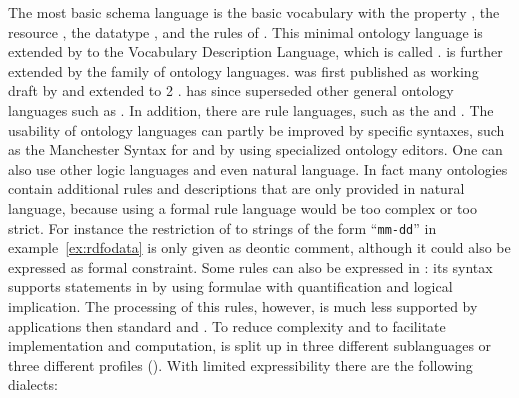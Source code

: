 The most basic schema language is the basic  vocabulary with the
property , the resource , the datatype
, and the rules of  \cite[section
3]{Hayes2004}. This minimal ontology language is extended by
\textcite{Brickley2004} to the  Vocabulary Description Language,
which is called .  is further extended by
the  family of ontology languages.  was first published as
working draft by \textcite{Dean2002} and extended to 2
\cite{Schneider2009}.  has since superseded other general ontology
languages such as .  In addition, there are rule languages, such
as the  \cite{Kifer2010} and  \cite{Knublauch2011}.  The usability of ontology
languages can partly be improved by specific syntaxes, such as the Manchester
Syntax for  \cite{Horridge2009} and by using specialized ontology
editors. One can also use other logic languages and even natural language. In
fact many ontologies contain additional rules and descriptions that are only
provided in natural language, because using a formal rule language would be too
complex or too strict.  For instance the restriction of  to
strings of the form ``\texttt{mm-dd}'' in example~\ref{ex:rdfodata} is only
given as deontic comment, although it could also be expressed as formal
constraint. Some rules can also be expressed in : its syntax
supports statements in  by using formulae
with quantification and logical implication. The processing of this rules,
however, is much less supported by applications then standard  and
. To reduce complexity and to facilitate implementation and
computation,  is split up in three different sublanguages
\cite{Dean2002} or three different profiles (). With limited
expressibility there are the following dialects:

